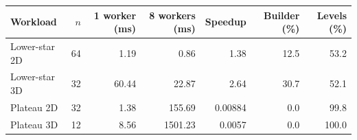 \begin{tabular}{lrrrrrr}
\hline
Workload & $n$ & 1 worker (ms) & 8 workers (ms) & Speedup & Builder (\%) & Levels (\%) \\
\hline
Lower-star 2D & 64 & 1.19 & 0.86 & 1.38 & 12.5 & 53.2 \\
Lower-star 3D & 32 & 60.44 & 22.87 & 2.64 & 30.7 & 52.1 \\
Plateau 2D & 32 & 1.38 & 155.69 & 0.00884 & 0.0 & 99.8 \\
Plateau 3D & 12 & 8.56 & 1501.23 & 0.0057 & 0.0 & 100.0 \\
\hline
\end{tabular}
